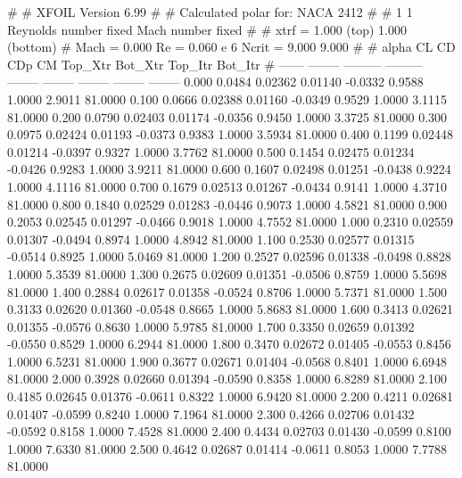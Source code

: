 #  
#       XFOIL         Version 6.99
#  
# Calculated polar for: NACA 2412                                       
#  
# 1 1 Reynolds number fixed          Mach number fixed         
#  
# xtrf =   1.000 (top)        1.000 (bottom)  
# Mach =   0.000     Re =     0.060 e 6     Ncrit =   9.000  9.000
#  
#   alpha    CL        CD       CDp       CM     Top_Xtr  Bot_Xtr  Top_Itr  Bot_Itr
#  ------ -------- --------- --------- -------- -------- -------- -------- --------
   0.000   0.0484   0.02362   0.01140  -0.0332   0.9588   1.0000   2.9011  81.0000
   0.100   0.0666   0.02388   0.01160  -0.0349   0.9529   1.0000   3.1115  81.0000
   0.200   0.0790   0.02403   0.01174  -0.0356   0.9450   1.0000   3.3725  81.0000
   0.300   0.0975   0.02424   0.01193  -0.0373   0.9383   1.0000   3.5934  81.0000
   0.400   0.1199   0.02448   0.01214  -0.0397   0.9327   1.0000   3.7762  81.0000
   0.500   0.1454   0.02475   0.01234  -0.0426   0.9283   1.0000   3.9211  81.0000
   0.600   0.1607   0.02498   0.01251  -0.0438   0.9224   1.0000   4.1116  81.0000
   0.700   0.1679   0.02513   0.01267  -0.0434   0.9141   1.0000   4.3710  81.0000
   0.800   0.1840   0.02529   0.01283  -0.0446   0.9073   1.0000   4.5821  81.0000
   0.900   0.2053   0.02545   0.01297  -0.0466   0.9018   1.0000   4.7552  81.0000
   1.000   0.2310   0.02559   0.01307  -0.0494   0.8974   1.0000   4.8942  81.0000
   1.100   0.2530   0.02577   0.01315  -0.0514   0.8925   1.0000   5.0469  81.0000
   1.200   0.2527   0.02596   0.01338  -0.0498   0.8828   1.0000   5.3539  81.0000
   1.300   0.2675   0.02609   0.01351  -0.0506   0.8759   1.0000   5.5698  81.0000
   1.400   0.2884   0.02617   0.01358  -0.0524   0.8706   1.0000   5.7371  81.0000
   1.500   0.3133   0.02620   0.01360  -0.0548   0.8665   1.0000   5.8683  81.0000
   1.600   0.3413   0.02621   0.01355  -0.0576   0.8630   1.0000   5.9785  81.0000
   1.700   0.3350   0.02659   0.01392  -0.0550   0.8529   1.0000   6.2944  81.0000
   1.800   0.3470   0.02672   0.01405  -0.0553   0.8456   1.0000   6.5231  81.0000
   1.900   0.3677   0.02671   0.01404  -0.0568   0.8401   1.0000   6.6948  81.0000
   2.000   0.3928   0.02660   0.01394  -0.0590   0.8358   1.0000   6.8289  81.0000
   2.100   0.4185   0.02645   0.01376  -0.0611   0.8322   1.0000   6.9420  81.0000
   2.200   0.4211   0.02681   0.01407  -0.0599   0.8240   1.0000   7.1964  81.0000
   2.300   0.4266   0.02706   0.01432  -0.0592   0.8158   1.0000   7.4528  81.0000
   2.400   0.4434   0.02703   0.01430  -0.0599   0.8100   1.0000   7.6330  81.0000
   2.500   0.4642   0.02687   0.01414  -0.0611   0.8053   1.0000   7.7788  81.0000
